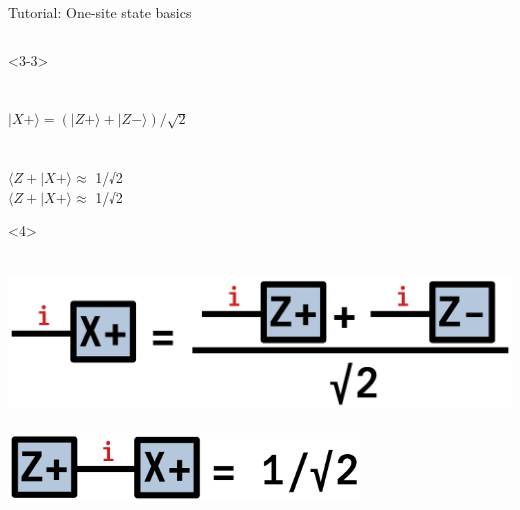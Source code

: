 \begin{frame}[fragile]{Tutorial: One-site state basics}
\begin{columns}
\begin{column}[T]{0.6\textwidth}
\begin{onlyenv}<3-3>
~\\
~\\
~\\
$|X+\rangle = (|Z+\rangle + |Z-\rangle)/\sqrt{2}$ \\
~\\
~\\
$\langle Z+|X+\rangle\approx$ 1/√2 \\
$\langle Z+|X+\rangle\approx$ 1/√2
\end{onlyenv}

\begin{onlyenv}<4>
~\\
~\\
\vspace*{-0.1cm}
\begin{center}
\includegraphics[width=1.0\textwidth]{
  slides/assets/Zp+Zm.png
} \\
~\\
\includegraphics[width=0.7\textwidth]{
  slides/assets/ZpXp.png
}
\end{center}
\end{onlyenv}
\end{column}

\end{columns}

\end{frame}

